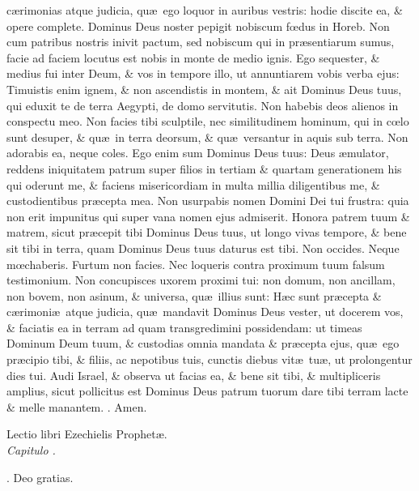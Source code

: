\documentclass[letter,11pt]{book}
\makeatletter
\DeclareRobustCommand{\Rbar}{\vers@resp{0pt}{R}}
\newcommand{\vers@resp@sym}{\raisebox{0.2ex}{\rotatebox[origin=c]{-20}{$\m@th\rceil$}}}
\newcommand{\vers@resp}[2]{%
  {\ooalign{\hidewidth\kern#1\vers@resp@sym\hidewidth\cr#2\cr}}%
}%
\def\R{\color{Red} \Rbar . \color{black}}
\makeatother
\begin{document}
\begin{multicols*}{2}
c\ae rimonias atque judicia, qu\ae \ ego loquor in auribus vestris: hodie discite ea, \& opere complete. Dominus Deus noster pepigit nobiscum f\oe dus in Horeb. Non cum patribus nostris inivit pactum, sed nobiscum qui in pr\ae sentiarum sumus, facie ad faciem locutus est nobis in monte de medio ignis. Ego sequester, \& medius fui inter Deum, \& vos in tempore illo, ut annuntiarem vobis verba ejus: Timuistis enim ignem, \& non ascendistis in montem, \& ait Dominus Deus tuus, qui eduxit te de terra Aegypti, de domo servitutis. Non habebis deos alienos in conspectu meo. Non facies tibi sculptile, nec similitudinem hominum, qui in c\oe lo sunt desuper, \& qu\ae \ in terra deorsum, \& qu\ae \ versantur in aquis sub terra. Non adorabis ea, neque coles. Ego enim sum Dominus Deus tuus: Deus \ae mulator, reddens iniquitatem patrum super filios in tertiam \& quartam generationem his qui oderunt me, \& faciens misericordiam in multa millia diligentibus me, \& custodientibus pr\ae cepta mea. Non usurpabis nomen Domini Dei tui frustra: quia non erit impunitus qui super vana nomen ejus admiserit. Honora patrem tuum \& matrem, sicut pr\ae cepit tibi Dominus Deus tuus, ut longo vivas tempore, \& bene sit tibi in terra, quam Dominus Deus tuus daturus est tibi. Non occides. Neque m\oe chaberis. Furtum non facies. Nec loqueris contra proximum tuum falsum testimonium. Non concupisces uxorem proximi tui: non domum, non ancillam, non bovem, non asinum, \& universa, qu\ae \ illius sunt: H\ae c sunt pr\ae cepta \& c\ae rimoni\ae \ atque judicia, qu\ae \ mandavit Dominus Deus vester, ut docerem vos, \& faciatis ea in terram ad quam transgredimini possidendam: ut timeas Dominum Deum tuum, \& custodias omnia mandata \& pr\ae cepta ejus, qu\ae \ ego pr\ae cipio tibi, \& filiis, ac nepotibus tuis, cunctis diebus vit\ae \ tu\ae , ut prolongentur dies tui. Audi Israel, \& observa ut facias ea, \& bene sit tibi, \& multipliceris amplius, sicut pollicitus est Dominus Deus patrum tuorum dare tibi terram lacte \& melle manantem. \R Amen.
\vspace{-.5em} \begin{center} {\color{Red} L}ectio libri Ezechielis Prophet\ae . \\ \itshape Capitulo . \color{black} \end{center} \vspace{-.5em}
\par \noindent \R Deo gratias.

\end{multicols*}
\end{document}

